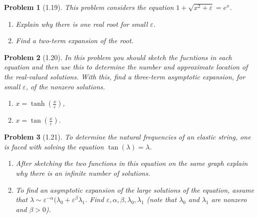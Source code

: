 \documentclass[11pt]{article}
\newcommand{\vep}{\varepsilon}
\theoremstyle{problemstyle}
\newtheorem{problem}{Problem}
\begin{document}
\begin{problem}[1.19]
  This problem considers the equation $1 + \sqrt{x^2 + \vep} = e^x$.
  \begin{enumerate}
    \item Explain why there is one real root for small $\vep$.
    \item Find a two-term expansion of the root.
  \end{enumerate}
\end{problem}

\begin{problem}[1.20]
  In this problem you should sketch the fucntions in each equation and then use this to determine
  the number and approximate location of the real-valued solutions. With this, find a three-term
  asymptotic expansion, for small $\vep$, of the nonzero solutions.
  \begin{enumerate}
    \item $x = \tanh \left(\frac{x}{\vep}\right)$,
    \item $x = \tan\left(\frac{x}{\vep}\right)$.
  \end{enumerate}
\end{problem}

\begin{problem}[1.21]
  To determine the natural frequencies of an elastic string, one is faced with solving the equation
  $\tan(\lambda) = \lambda$.
  \begin{enumerate}
    \item After sketching the two functions in this equation on the same graph explain why there is
      an infinite number of solutions.
    \item To find an asymptotic expansion of the large solutions of the equation, assume that
      $\lambda \sim \vep^{-\alpha}(\lambda_0 + \vep^\beta\lambda_1$. Find
      $\vep, \alpha, \beta, \lambda_0, \lambda_1$ (note that $\lambda_0$ and $\lambda_1$ are
      nonzero and $\beta > 0$).
  \end{enumerate}
\end{problem}
\end{document}
